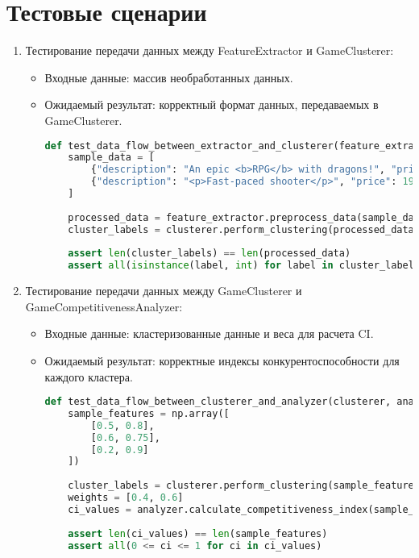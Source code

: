 \documentclass{article}
\begin{document}
\section{Тестовые сценарии}
\begin{enumerate}[label=\arabic*.]
    \item Тестирование передачи данных между FeatureExtractor и GameClusterer:
    \begin{itemize}
        \item Входные данные: массив необработанных данных.
        \item Ожидаемый результат: корректный формат данных, передаваемых в GameClusterer.
        \begin{lstlisting}[language=Python]
def test_data_flow_between_extractor_and_clusterer(feature_extractor, clusterer):
    sample_data = [
        {"description": "An epic <b>RPG</b> with dragons!", "price": 59.99},
        {"description": "<p>Fast-paced shooter</p>", "price": 19.99}
    ]
    
    processed_data = feature_extractor.preprocess_data(sample_data)
    cluster_labels = clusterer.perform_clustering(processed_data, n_clusters=2)
    
    assert len(cluster_labels) == len(processed_data)
    assert all(isinstance(label, int) for label in cluster_labels)
        \end{lstlisting}
    \end{itemize}

    \item Тестирование передачи данных между GameClusterer и GameCompetitivenessAnalyzer:
    \begin{itemize}
        \item Входные данные: кластеризованные данные и веса для расчета CI.
        \item Ожидаемый результат: корректные индексы конкурентоспособности для каждого кластера.
        \begin{lstlisting}[language=Python]
def test_data_flow_between_clusterer_and_analyzer(clusterer, analyzer):
    sample_features = np.array([
        [0.5, 0.8],
        [0.6, 0.75],
        [0.2, 0.9]
    ])
    
    cluster_labels = clusterer.perform_clustering(sample_features, n_clusters=2)
    weights = [0.4, 0.6]
    ci_values = analyzer.calculate_competitiveness_index(sample_features, weights)
    
    assert len(ci_values) == len(sample_features)
    assert all(0 <= ci <= 1 for ci in ci_values)
        \end{lstlisting}
    \end{itemize}


\end{enumerate}
\end{document}
